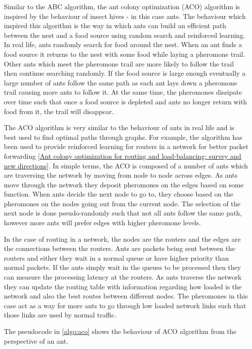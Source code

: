 Similar to the ABC algorithm, the ant colony optimization (ACO) algorithm is inspired by the behaviour of insect hives - in this case ants. The behaviour which inspired this algorithm is the way in which ants can build an efficient path between the nest and a food source using random search and reinforced learning. In real life, ants randomly search for food around the nest. When an ant finds a food source it returns to the nest with some food while laying a pheromone trail. Other ants which meet the pheromone trail are more likely to follow the trail then continue searching randomly. If the food source is large enough eventually a large number of ants follow the same path as each ant lays down a pheromone trail causing more ants to follow it. At the same time, the pheromones dissipate over time such that once a food source is depleted and ants no longer return with food from it, the trail will disappear. 

The ACO algorithm is very similar to the behaviour of ants in real life and is best used to find optimal paths through graphs. For example, the algorithm has been used to provide reinforced learning for routers in a network for better packet forwarding \ref{Ant colony optimization for routing and load-balancing: survey and new directions}. In simple terms, the ACO is composed of a number of ants which are traversing the network by moving from node to node across edges. As ants move through the network they deposit pheromones on the edges based on some function. When ants decide the next node to go to, they choose based on the pheromones on the nodes going out from the current node. The selection of the next node is done pseudo-randomly such that not all ants follow the same path, however more ants will prefer edges with higher pheromone levels. 

In the case of routing in a network, the nodes are the routers and the edges are the connections between the routers. Ants are packets being sent between the routers and either they wait in a normal queue or have higher priority than normal packets. If the ants simply wait in the queues to be processed then they can measure the processing latency at the routers. As ants traverse the network they can update the routing table with information regarding how loaded is the network and also the best routes between different nodes. The pheromones in this case act as a way for more ants to go through low loaded network links such that those links are used by normal traffic.

The pseudocode in \ref{algo:aco} shows the behaviour of ACO algorithm from the perspective of an ant.

